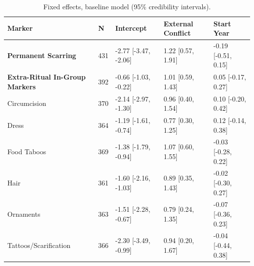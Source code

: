 \begin{table}[!ht]
\centering
\small
\caption{Fixed effects, baseline model (95\% credibility intervals).}
\label{tab:ext_fixed_effects_baseline}
\begin{tabular}{p{4cm}llll}
\toprule
Marker & N & Intercept & External Conflict & Start Year \\
\midrule
\textbf{Permanent Scarring} & 431 & -2.77 [-3.47, -2.06] & 1.22 [0.57, 1.91] & -0.19 [-0.51, 0.15] \\
\textbf{Extra-Ritual In-Group Markers} & 392 & -0.66 [-1.03, -0.22] & 1.01 [0.59, 1.43] & 0.05 [-0.17, 0.27] \\
\midrule
Circumcision & 370 & -2.14 [-2.97, -1.30] & 0.96 [0.40, 1.54] & 0.10 [-0.20, 0.42] \\
Dress & 364 & -1.19 [-1.61, -0.74] & 0.77 [0.30, 1.25] & 0.12 [-0.14, 0.38] \\
Food Taboos & 369 & -1.38 [-1.79, -0.94] & 1.07 [0.60, 1.55] & -0.03 [-0.28, 0.22] \\
Hair & 361 & -1.60 [-2.16, -1.03] & 0.89 [0.35, 1.43] & -0.02 [-0.30, 0.27] \\
Ornaments & 363 & -1.51 [-2.28, -0.67] & 0.79 [0.24, 1.35] & -0.07 [-0.36, 0.23] \\
Tattoos/Scarification & 366 & -2.30 [-3.49, -0.99] & 0.94 [0.20, 1.67] & -0.04 [-0.44, 0.38] \\
\bottomrule
\end{tabular}
\end{table}